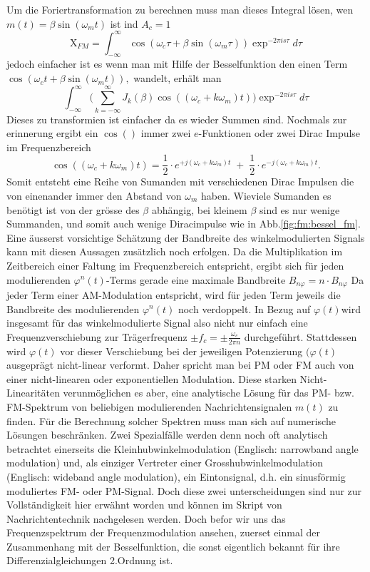 Um die Foriertransformation zu berechnen muss man dieses Integral lösen,
wen \( m(t) = \beta\sin(\omega_mt) \) ist ind \(A_c = 1\)
\[
    \textrm{X}_{FM} = \int^\infty_{-\infty} \cos (\omega_c \tau +\beta\sin(\omega_m\tau)) \exp^{-2\pi i s \tau}d\tau
\]
jedoch einfacher ist es wenn man mit Hilfe der Besselfunktion den einen Term \(\cos(\omega_c t+\beta\sin(\omega_mt)),\) wandelt,  erhält man
\[
    \int^\infty_{-\infty}
\biggl(
\sum_{k= -\infty}^\infty J_{k}(\beta) \cos((\omega_c+k\omega_m)t)
\biggr) \exp^{-2\pi i s \tau}d\tau
\]
Dieses zu transformien ist einfacher da es wieder Summen sind.
Nochmals zur erinnerung ergibt ein \( \cos() \) immer zwei \(e\)-Funktionen oder zwei Dirac Impulse im Frequenzbereich
\[
    \cos((\omega_c+k\omega_m)t) = \frac{1}{2} \cdot e^{+j(\omega_c+k\omega_m)t}\;+\;\frac{1}{2} \cdot e^{-j(\omega_c+k\omega_m)t}.
\]
Somit entsteht eine Reihe von Sumanden mit verschiedenen Dirac Impulsen die von einenander immer den Abstand von \(\omega_m\) haben.
Wieviele Sumanden es benötigt ist von der grösse des \(\beta\) abhängig, bei kleinem \(\beta\) sind es nur wenige Summanden, und somit auch wenige Diracimpulse wie in Abb.\ref{fig:fm:bessel_fm}.
Eine äusserst vorsichtige Schätzung der Bandbreite des winkelmodulierten Signals kann mit diesen Aussagen zusätzlich noch erfolgen.
Da die Multiplikation im Zeitbereich einer Faltung im Frequenzbereich entspricht, ergibt sich für jeden modulierenden \(\varphi^n (t)\)-Terms gerade 
eine maximale Bandbreite \(B_{n\varphi} = n \cdot B_{n\varphi}\)
Da jeder Term einer AM-Modulation entspricht, wird für jeden Term jeweils die Bandbreite des modulierenden \(\varphi^n (t)\) noch verdoppelt.
In Bezug auf \(\varphi(t)\)wird insgesamt für das winkelmodulierte Signal also nicht nur einfach eine 
Frequenzverschiebung zur Trägerfrequenz \(\pm f_c = \pm \frac{\omega_c}{2\pi n}\) durchgeführt.
Stattdessen wird \(\varphi(t)\) vor dieser Verschiebung bei der jeweiligen Potenzierung \((\varphi(t)\) ausgeprägt nicht-linear verformt.
Daher spricht man bei PM oder FM auch von einer nicht-linearen oder exponentiellen Modulation.
Diese starken Nicht-Linearitäten verunmöglichen es aber, eine analytische Lösung für das PM- bzw. FM-Spektrum von beliebigen modulierenden Nachrichtensignalen \(m(t)\) zu finden.
Für die Berechnung solcher Spektren muss man sich auf numerische Lösungen beschränken.
Zwei Spezialfälle werden denn noch oft analytisch betrachtet einerseits die Kleinhubwinkelmodulation (Englisch: narrowband angle modulation) und, als
einziger Vertreter einer Grosshubwinkelmodulation (Englisch: wideband angle modulation), ein Eintonsignal, d.h. ein sinusförmig moduliertes FM- oder PM-Signal.
Doch diese zwei unterscheidungen sind nur zur Vollständigkeit hier erwähnt worden und können im Skript von Nachrichtentechnik \cite{fm:NAT} nachgelesen werden.
Doch befor wir uns das Frequenzspektrum der Frequenzmodulation ansehen, zuerset einmal der Zusammenhang mit der Besselfunktion, 
die sonst eigentlich bekannt für ihre Differenzialgleichungen 2.Ordnung ist.

